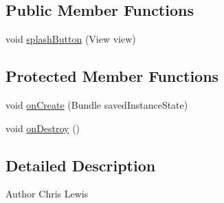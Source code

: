 \subsection*{Public Member Functions}
\begin{DoxyCompactItemize}
\item 
void \hyperlink{classuk_1_1ac_1_1swan_1_1digitaltrails_1_1activities_1_1_splash_activity_ae00c23cebc9fd339ea16ba9a23f8cf85}{splash\+Button} (View view)
\end{DoxyCompactItemize}
\subsection*{Protected Member Functions}
\begin{DoxyCompactItemize}
\item 
void \hyperlink{classuk_1_1ac_1_1swan_1_1digitaltrails_1_1activities_1_1_splash_activity_a14c954c1ba8972807634bba2fd646754}{on\+Create} (Bundle saved\+Instance\+State)
\item 
void \hyperlink{classuk_1_1ac_1_1swan_1_1digitaltrails_1_1activities_1_1_splash_activity_a787a8dd881d9ead436cc1b47c3a51fe0}{on\+Destroy} ()
\end{DoxyCompactItemize}


\subsection{Detailed Description}
\begin{DoxyAuthor}{Author}
Chris Lewis 
\end{DoxyAuthor}


